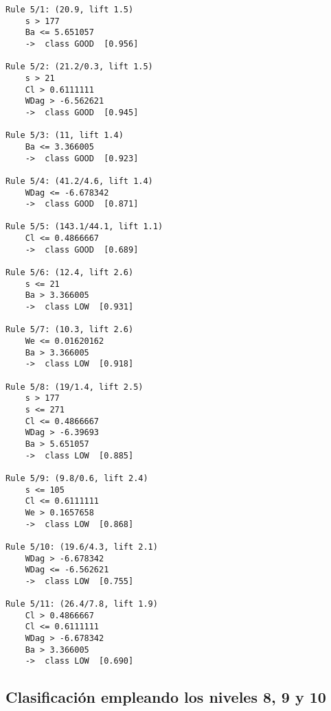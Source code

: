 \begin{tcolorbox}[title=Reglas de clasificación para identificar grupos de tipo \emph{``LOW''}.]
  \makeatletter
  \makeatother
\begin{multicols}{2}
    \begin{verbatim}
Rule 5/1: (20.9, lift 1.5)
	s > 177
	Ba <= 5.651057
	->  class GOOD  [0.956]

Rule 5/2: (21.2/0.3, lift 1.5)
	s > 21
	Cl > 0.6111111
	WDag > -6.562621
	->  class GOOD  [0.945]

Rule 5/3: (11, lift 1.4)
	Ba <= 3.366005
	->  class GOOD  [0.923]

Rule 5/4: (41.2/4.6, lift 1.4)
	WDag <= -6.678342
	->  class GOOD  [0.871]

Rule 5/5: (143.1/44.1, lift 1.1)
	Cl <= 0.4866667
	->  class GOOD  [0.689]

Rule 5/6: (12.4, lift 2.6)
	s <= 21
	Ba > 3.366005
	->  class LOW  [0.931]

Rule 5/7: (10.3, lift 2.6)
	We <= 0.01620162
	Ba > 3.366005
	->  class LOW  [0.918]

Rule 5/8: (19/1.4, lift 2.5)
	s > 177
	s <= 271
	Cl <= 0.4866667
	WDag > -6.39693
	Ba > 5.651057
	->  class LOW  [0.885]

Rule 5/9: (9.8/0.6, lift 2.4)
	s <= 105
	Cl <= 0.6111111
	We > 0.1657658
	->  class LOW  [0.868]

Rule 5/10: (19.6/4.3, lift 2.1)
	WDag > -6.678342
	WDag <= -6.562621
	->  class LOW  [0.755]

Rule 5/11: (26.4/7.8, lift 1.9)
	Cl > 0.4866667
	Cl <= 0.6111111
	WDag > -6.678342
	Ba > 3.366005
	->  class LOW  [0.690]
    \end{verbatim}
  \end{multicols}
\label{rules1}
\end{tcolorbox}

\subsection{Clasificación empleando los niveles 8, 9 y 10}